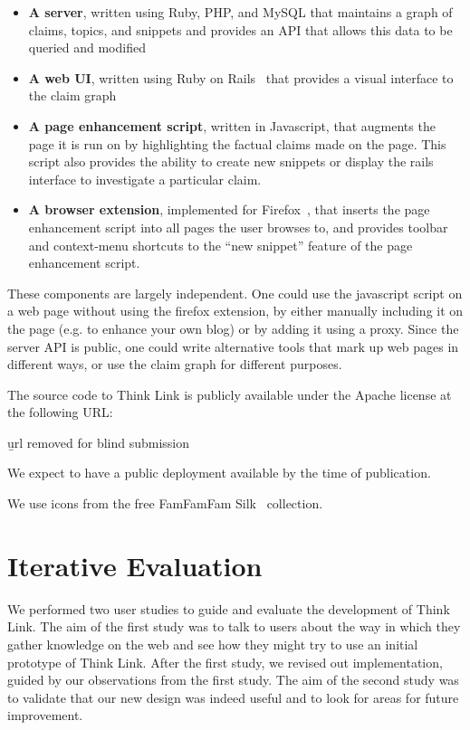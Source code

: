 \documentclass{chi2009}
\begin{document}
\begin{itemize}
\item {\bf A server}, written using Ruby, PHP, and MySQL that maintains a graph of claims, topics, and snippets and provides an API that allows this data to be queried and modified
\item {\bf A web UI}, written using Ruby on Rails~\cite{rails} that provides a visual interface to the claim graph
\item {\bf A page enhancement script}, written in Javascript, that augments the page it is run on by highlighting the factual claims made on the page. This script also provides the ability to create new snippets or display the rails interface to investigate a particular claim.
\item {\bf A browser extension}, implemented for Firefox~\cite{firefoxextension}, that inserts the page enhancement script into all pages the user browses to, and provides toolbar and context-menu shortcuts to the ``new snippet'' feature of the page enhancement script.
\end{itemize}

These components are largely independent. One could use the javascript script on a web page without using the firefox extension, by either manually including it on the page (e.g. to enhance your own blog) or by adding it using a proxy. Since the server API is public, one could write alternative tools that mark up web pages in different ways, or use the claim graph for different purposes.

The source code to Think Link is publicly available under the Apache license at the following URL:

{\b url removed for blind submission}

We expect to have a public deployment available by the time of publication.

We use icons from the free FamFamFam Silk~\cite{silkicons} collection.


\section{Iterative Evaluation}

We performed two user studies to guide and evaluate the development of Think Link. The aim of the first study was to talk to users about the way in which they gather knowledge on the web and see how they might try to use an initial prototype of Think Link. After the first study, we revised out implementation, guided by our observations from the first study. The aim of the second study was to validate that our new design was indeed useful and to look for areas for future improvement.
\end{document}
